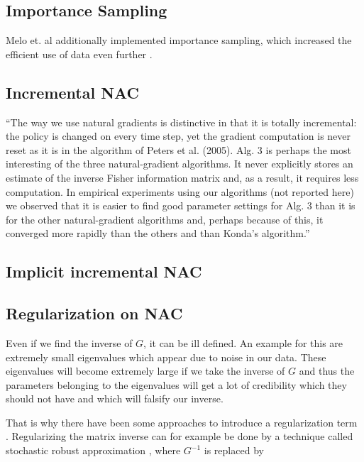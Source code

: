 \subsection{Importance Sampling}

Melo et. al additionally implemented importance sampling, which increased the efficient use of data even further \cite{melo2008fitted}.

\subsection{Incremental NAC}

``The way we use natural gradients is distinctive in that it is totally incremental: the policy is changed on every time step, yet the gradient computation is never reset as it is in the algorithm of Peters et al. (2005). Alg. 3 is perhaps the most interesting of the three natural-gradient algorithms. It never explicitly stores an estimate of the inverse Fisher information matrix and, as a result, it requires less computation. In empirical experiments using our algorithms (not reported here) we observed that it is easier to ﬁnd good parameter settings for Alg. 3 than it is for the other natural-gradient algorithms and, perhaps because of this, it converged more rapidly than the others and than Konda’s algorithm.'' \cite{bhatnagar2008incremental}

\subsection{Implicit incremental NAC}



\subsection{Regularization on NAC}
	Even if we find the inverse of $G$, it can be ill defined. An example for this are extremely small eigenvalues which appear due to noise in our data. These eigenvalues will become extremely large if we take the inverse of $G$ and thus the parameters belonging to the eigenvalues will get a lot of credibility which they should not have and which will falsify our inverse.
	
	That is why there have been some approaches to introduce a regularization term \cite{sohl2012natural}. Regularizing the matrix inverse can for example be done by a technique called stochastic robust approximation \cite{boyd2004convex}, where $G^{-1}$ is replaced by 
	
